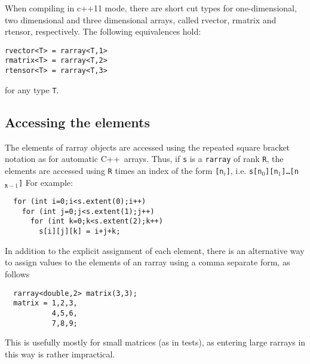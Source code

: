 \documentclass[11pt,twoside]{article}
\newcommand{\cxx}{C{++}}
\begin{document}
When compiling in c++11 mode, there are short cut types for
one-dimensional, two dimensional and three dimensional arrays, called
rvector, rmatrix and rtensor, respectively. The following equivalences hold:

\begin{framed}\vspace{-18pt}%
\begin{verbatim}
rvector<T> = rarray<T,1>
rmatrix<T> = rarray<T,2>
rtensor<T> = rarray<T,3>
\end{verbatim}
\vspace{-18pt}\end{framed}\noindent
for any type \texttt{T}.

\subsection{Accessing the elements}

The elements of rarray objects are accessed using the repeated square
bracket notation as for automatic \cxx\ arrays. Thus, if \texttt{s} is a \texttt{rarray} of rank \texttt R, the elements are accessed using \texttt{R} times an index of the form \texttt{[n$_i$]}, i.e. \texttt{s[n$_0$][n$_1$]\dots[n$_{\texttt{R}-1}$]}
For example:\vspace{-9pt}
\begin{framed}\vspace{-18pt}%
\begin{verbatim}
  for (int i=0;i<s.extent(0);i++)
    for (int j=0;j<s.extent(1);j++)
      for (int k=0;k<s.extent(2);k++)
        s[i][j][k] = i+j+k;
\end{verbatim}%
\vspace{-12pt}
\end{framed}%

In addition to the explicit assignment of each element, there is an
alternative way to assign values to the elements of an rarray using a
comma separate form, as follows
\vspace{-9pt}
\begin{framed}\vspace{-18pt}%
\begin{verbatim}
  rarray<double,2> matrix(3,3);
  matrix = 1,2,3,
           4,5,6,
           7,8,9;
\end{verbatim}%
\vspace{-12pt}
\end{framed}\vspace{-8pt}\noindent
This is usefully mostly for small matrices (as in tests), as entering
large rarrays in this way is rather impractical.
\end{document}
